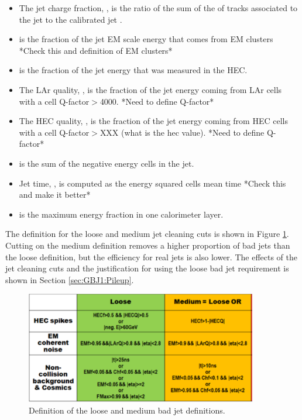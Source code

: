 \begin{itemize}
  \item The jet charge fraction, , is the ratio of the sum of the \pt{} of tracks associated to the jet to the calibrated jet \pt{}.  
  \item {} is the fraction of the jet EM scale energy that comes from EM clusters *Check this and definition of EM clusters*
  \item {} is the fraction of the jet energy that was measured in the HEC. 
  \item The LAr quality, , is the fraction of the jet energy coming from LAr cells with a cell Q-factor$>$4000. *Need to define Q-factor* 
  \item The HEC quality, , is the fraction of the jet energy coming from HEC cells with a cell Q-factor$>$XXX (what is the hec value). *Need to define Q-factor* 
  \item {} is the sum of the negative energy cells in the jet.
  \item Jet time, , is computed as the energy squared cells mean time *Check this and make it better*
  \item {} is the maximum energy fraction in one calorimeter layer.
\end{itemize}


The definition for the loose and medium jet cleaning cuts is shown in Figure \ref{GBJ1:JetCleanRel16}. 
Cutting on the medium definition removes a higher proportion of bad jets than the loose definition, but the efficiency for real jets is also lower.
The effects of the jet cleaning cuts and the justification for using the loose bad jet requirement is shown in Section \ref{sec:GBJ1:Pileup}.


\begin{figure}
  \centering
  \includegraphics[width=0.9\textwidth]{figures/GBJ1/JetCleaning/JetCleaningRel16.pdf}
  \caption{Definition of the loose and medium bad jet definitions.}
\label{GBJ1:JetCleanRel16}
\end{figure}


